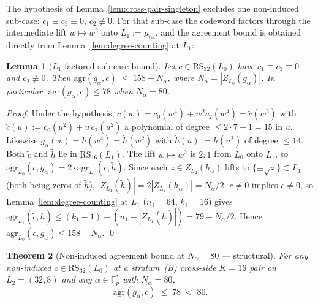 \documentclass[11pt]{article}
\newtheorem{theorem}{Theorem}[section]
\newtheorem{lemma}[theorem]{Lemma}
\theoremstyle{definition}
\theoremstyle{remark}
\begin{document}
The hypothesis of Lemma~\ref{lem:cross-pair-singleton} excludes one
non-induced sub-case: $c_1 \equiv c_3 \equiv 0$, $c_2 \not\equiv 0$. For
that sub-case the codeword factors through the intermediate lift
$w \mapsto w^2$ onto $L_1 := \mu_{64}$, and the agreement bound is
obtained directly from Lemma~\ref{lem:degree-counting} at $L_1$:

\begin{lemma}[$L_1$-factored sub-case bound]
\label{lem:L1-factored-bound}
Let $c \in \mathrm{RS}_{32}(L_0)$ have $c_1 \equiv c_3 \equiv 0$ and
$c_2 \not\equiv 0$. Then
$\mathrm{agr}(g_\alpha, c) \;\leq\; 158 - N_\alpha$,
where $N_\alpha = |Z_{L_0}(g_\alpha)|$. In particular,
$\mathrm{agr}(g_\alpha, c) \leq 78$ when $N_\alpha = 80$.
\end{lemma}

\begin{proof}
Under the hypothesis,
$c(w) = c_0(w^4) + w^2 c_2(w^4) = \tilde c(w^2)$ with
$\tilde c(u) := c_0(u^2) + u\, c_2(u^2)$ a polynomial of degree
$\leq 2 \cdot 7 + 1 = 15$ in $u$. Likewise
$g_\alpha(w) = h(w^4) = \tilde h(w^2)$ with
$\tilde h(u) := h(u^2)$ of degree $\leq 14$. Both $\tilde c$ and
$\tilde h$ lie in $\mathrm{RS}_{16}(L_1)$. The lift $w \mapsto w^2$
is $2{:}1$ from $L_0$ onto $L_1$, so
$\mathrm{agr}_{L_0}(c, g_\alpha) = 2 \cdot \mathrm{agr}_{L_1}(\tilde c, \tilde h)$.
Since each $z \in Z_{L_2}(h_\alpha)$ lifts to $\{\pm \sqrt z\} \subset L_1$
(both being zeros of $\tilde h$),
$|Z_{L_1}(\tilde h)| = 2 |Z_{L_2}(h_\alpha)| = N_\alpha / 2$.
$c \neq 0$ implies $\tilde c \neq 0$, so Lemma~\ref{lem:degree-counting} at $L_1$
($n_1 = 64$, $k_1 = 16$) gives
$\mathrm{agr}_{L_1}(\tilde c, \tilde h) \leq (k_1 - 1) + (n_1 - |Z_{L_1}(\tilde h)|)
= 79 - N_\alpha/2$. Hence
$\mathrm{agr}_{L_0}(c, g_\alpha) \leq 158 - N_\alpha$.
\qed
\end{proof}

\begin{theorem}[Non-induced agreement bound at $N_\alpha = 80$ — structural]
\label{thm:non-induced-agr-bound}
For any non-induced $c \in \mathrm{RS}_{32}(L_0)$ at a stratum~(B) cross-side
$K = 16$ pair on $L_2 = (32, 8)$ and any $\alpha \in \mathbb{F}_p^*$ with
$N_\alpha = 80$,
\[
\mathrm{agr}(g_\alpha, c) \;\leq\; 78 \;<\; 80.
\]
\end{theorem}
\end{document}
